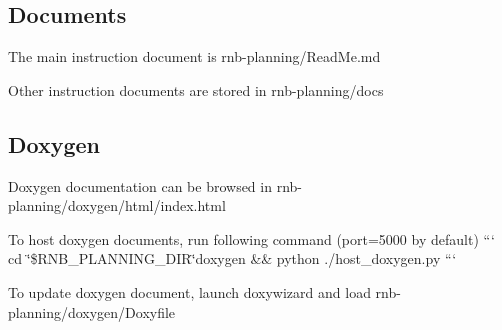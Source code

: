 \subsection*{Documents}


\begin{DoxyItemize}
\item The main instruction document is rnb-\/planning/\+Read\+Me.\+md
\item Other instruction documents are stored in rnb-\/planning/docs
\end{DoxyItemize}

\subsection*{Doxygen}


\begin{DoxyItemize}
\item Doxygen documentation can be browsed in rnb-\/planning/doxygen/html/index.\+html
\item To host doxygen documents, run following command (port=5000 by default) ``` cd \char`\"{}\$\+R\+N\+B\+\_\+\+P\+L\+A\+N\+N\+I\+N\+G\+\_\+\+D\+I\+R\char`\"{}doxygen \&\& python ./host\+\_\+doxygen.py ```
\item To update doxygen document, launch doxywizard and load rnb-\/planning/doxygen/\+Doxyfile 
\end{DoxyItemize}